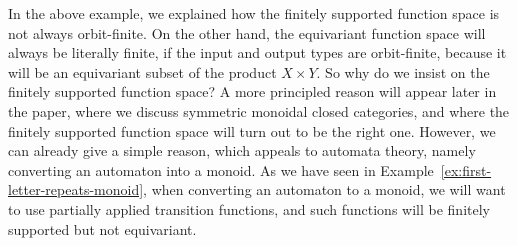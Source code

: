 \documentclass[10pt,a4paper]{amsart}
\numberwithin{equation}{section}
\theoremstyle{plain}
\newcommand{\set}[1]{\{#1\}}
\newcommand{\atoms}{\mathbb A}
\newcommand{\setbuild}[2]{\set{#1 \ | 
\begin{tabular}{l}
	#2
\end{tabular}\!\!} }
\begin{document}
In the above example, we explained how the finitely supported function space is not always orbit-finite. On the other hand, the equivariant function space will always be literally finite, if the input and output types are orbit-finite, because it will be an equivariant subset of the product $X \times Y$. So why do we insist on the finitely supported function space? A more principled reason will appear later in the paper, where we discuss symmetric monoidal closed categories, and where the finitely supported function space will turn out to be the right one. However, we can already give a simple reason, which appeals to automata theory, namely converting an automaton into a monoid. As we have seen in Example~\ref{ex:first-letter-repeats-monoid}, when converting an automaton to a monoid, we will want to use partially applied transition functions, and such functions will be finitely supported but not equivariant.



 
\end{document}
